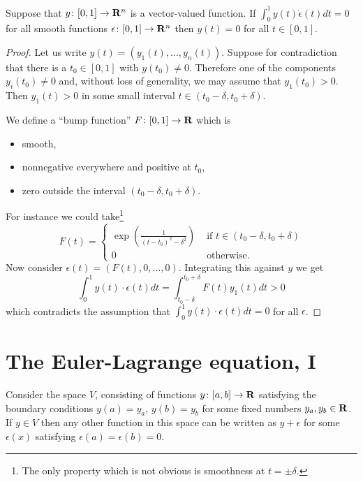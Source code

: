 \begin{thm}
Suppose that $y\colon[0,1]\to\mathbf{R}^n$ is a vector-valued function. If $\int_0^1y(t)\dot\epsilon(t)dt=0$ for all smooth functions $\epsilon\colon[0,1]\to\mathbf{R}^n$ then $y(t)=0$ for all $t\in[0,1]$.
\end{thm}
\begin{proof}
Let us write $y(t)=(y_1(t),\ldots,y_n(t))$. Suppose for contradiction that there is a $t_0\in[0,1]$ with $y(t_0)\neq 0$. Therefore one of the components $y_i(t_0)\neq 0$ and, without loss of generality, we may assume that $y_1(t_0)>0$. Then $y_1(t)>0$ in some small interval $t\in(t_0-\delta,t_0+\delta)$.

We define a ``bump function'' $F\colon[0,1]\to\mathbf{R}$ which is
\begin{itemize}
\item smooth,
\item nonnegative everywhere and positive at $t_0$,
\item zero outside the interval $(t_0-\delta,t_0+\delta)$.
\end{itemize}
For instance we could take\footnote{The only property which is not obvious is smoothness at $t=\pm\delta$.}
\[F(t)=\begin{cases}\exp\left(\frac{1}{(t-t_0)^2-\delta^2}\right)&\mbox{ if }t\in(t_0-\delta,t_0+\delta)\\
0 & \mbox{ otherwise.}\end{cases}\]
Now consider $\epsilon(t)=(F(t),0,\ldots,0)$. Integrating this against $y$ we get
\[\int_0^1y(t)\cdot\epsilon(t)dt=\int_{t_0-\delta}^{t_0+\delta}F(t)y_1(t)dt>0\]
which contradicts the assumption that $\int_0^1y(t)\cdot\epsilon(t)dt=0$ for all $\epsilon$.
\end{proof}


\chapter[Euler-Lagrange, I]{The Euler-Lagrange equation, I}

Consider the space $V$, consisting of functions $y\colon[a,b]\to\mathbf{R}$ satisfying the boundary conditions $y(a)=y_a$, $y(b)=y_b$ for some fixed numbers $y_a,y_b\in\mathbf{R}$. If $y\in V$ then any other function in this space can be written as $y+\epsilon$ for some $\epsilon(x)$ satisfying $\epsilon(a)=\epsilon(b)=0$.

